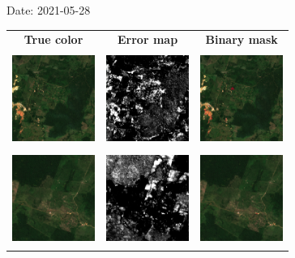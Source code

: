 \documentclass{beamer}
\begin{document}
\begin{frame}{Date: 2021-05-28}
    \begin{tabular}{ccc}
        \textbf{True color} & \textbf{Error map} & \textbf{Binary mask}\\
        \includegraphics[width=2.7cm,height=3cm]{Figures/v6/20210528/TCI_zoom3.png}& \includegraphics[width=2.7cm,height=3cm]{Figures/v6/20210528/error_map_zoom3.png} &\includegraphics[width=2.7cm,height=3cm]{Figures/v6/20210528/zoom3_BI.png}\\
        \includegraphics[width=2.7cm,height=3cm]{Figures/v6/20210528/TCI_zoom4.png}& \includegraphics[width=2.7cm,height=3cm]{Figures/v6/20210528/error_map_zoom4.png} &\includegraphics[width=2.7cm,height=3cm]{Figures/v6/20210528/zoom4_BI.png}\\
        \end{tabular}
\end{frame}
\end{document}
